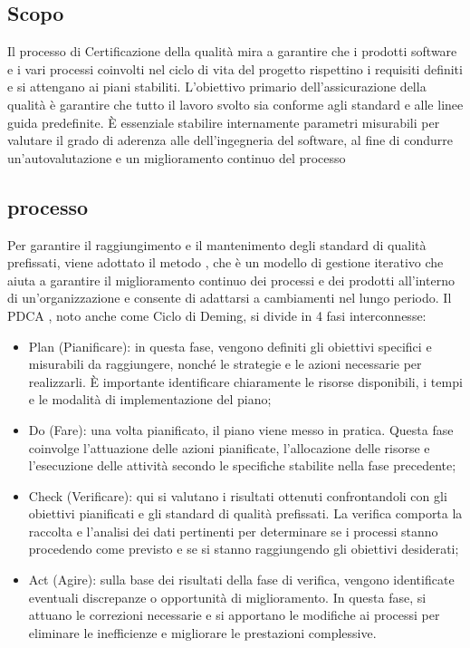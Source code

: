 \subsection{Scopo}
Il processo di Certificazione della qualità mira a garantire che i prodotti software e i vari processi coinvolti nel ciclo di vita del progetto rispettino i requisiti definiti e si attengano ai piani stabiliti. L'obiettivo primario dell'assicurazione della qualità è garantire che tutto il lavoro svolto sia conforme agli standard e alle linee guida predefinite. È essenziale stabilire internamente parametri misurabili per valutare il grado di aderenza alle  dell'ingegneria del software, al fine di condurre un'autovalutazione e un miglioramento continuo del processo

\subsection{processo}

Per garantire il raggiungimento e il mantenimento degli standard di qualità prefissati, viene adottato il metodo , che è un modello di gestione iterativo che aiuta a garantire il miglioramento continuo dei processi e dei prodotti all'interno di un'organizzazione e consente di adattarsi a cambiamenti nel lungo periodo. Il PDCA , noto anche come Ciclo di Deming, si divide in 4 fasi interconnesse:

\begin{itemize}
    \item Plan (Pianificare): in questa fase, vengono definiti gli obiettivi specifici e misurabili da raggiungere, nonché le strategie e le azioni necessarie per realizzarli. È importante identificare chiaramente le risorse disponibili, i tempi e le modalità di implementazione del piano;
    \item Do (Fare): una volta pianificato, il piano viene messo in pratica. Questa fase coinvolge l'attuazione delle azioni pianificate, l'allocazione delle risorse e l'esecuzione delle attività secondo le specifiche stabilite nella fase precedente;
    \item Check (Verificare): qui si valutano i risultati ottenuti confrontandoli con gli obiettivi pianificati e gli standard di qualità prefissati. La verifica comporta la raccolta e l'analisi dei dati pertinenti per determinare se i processi stanno procedendo come previsto e se si stanno raggiungendo gli obiettivi desiderati;
    \item Act (Agire): sulla base dei risultati della fase di verifica, vengono identificate eventuali discrepanze o opportunità di miglioramento. In questa fase, si attuano le correzioni necessarie e si apportano le modifiche ai processi per eliminare le inefficienze e migliorare le prestazioni complessive.
\end{itemize}

